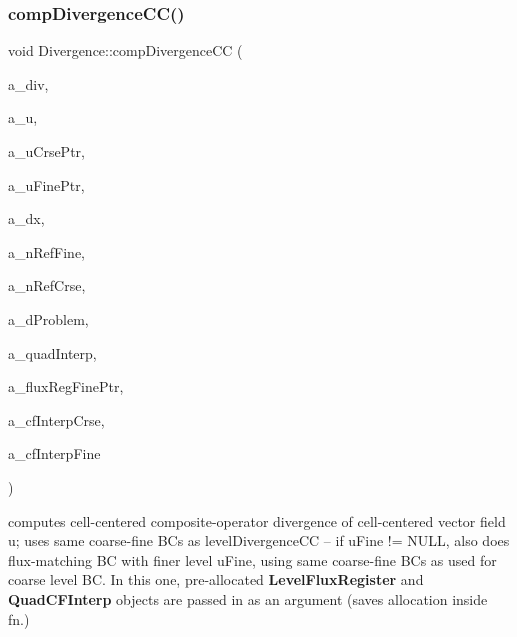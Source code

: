 \subsubsection{\texorpdfstring{comp\+Divergence\+C\+C()}{compDivergenceCC()}\hspace{0.1cm}{\footnotesize\ttfamily [3/4]}}
{\footnotesize\ttfamily void Divergence\+::comp\+Divergence\+CC (\begin{DoxyParamCaption}\item[{\textbf{ Level\+Data}$<$ \textbf{ F\+Array\+Box} $>$ \&}]{a\+\_\+div,  }\item[{\textbf{ Level\+Data}$<$ \textbf{ F\+Array\+Box} $>$ \&}]{a\+\_\+u,  }\item[{\textbf{ Level\+Data}$<$ \textbf{ F\+Array\+Box} $>$ $\ast$}]{a\+\_\+u\+Crse\+Ptr,  }\item[{\textbf{ Level\+Data}$<$ \textbf{ F\+Array\+Box} $>$ $\ast$}]{a\+\_\+u\+Fine\+Ptr,  }\item[{const \textbf{ Real}}]{a\+\_\+dx,  }\item[{const int}]{a\+\_\+n\+Ref\+Fine,  }\item[{const int}]{a\+\_\+n\+Ref\+Crse,  }\item[{const \textbf{ Problem\+Domain} \&}]{a\+\_\+d\+Problem,  }\item[{const bool}]{a\+\_\+quad\+Interp,  }\item[{\textbf{ Level\+Flux\+Register} $\ast$}]{a\+\_\+flux\+Reg\+Fine\+Ptr,  }\item[{\textbf{ Quad\+C\+F\+Interp} \&}]{a\+\_\+cf\+Interp\+Crse,  }\item[{\textbf{ Quad\+C\+F\+Interp} \&}]{a\+\_\+cf\+Interp\+Fine }\end{DoxyParamCaption})\hspace{0.3cm}{\ttfamily [static]}}

computes cell-\/centered composite-\/operator divergence of cell-\/centered vector field u; uses same coarse-\/fine BC\textquotesingle{}s as level\+Divergence\+CC -- if u\+Fine != N\+U\+LL, also does flux-\/matching BC with finer level u\+Fine, using same coarse-\/fine BC\textquotesingle{}s as used for coarse level BC. In this one, pre-\/allocated \textbf{ Level\+Flux\+Register} and \textbf{ Quad\+C\+F\+Interp} objects are passed in as an argument (saves allocation inside fn.) \mbox{\label{class_divergence_ab20b13344306e041cbf99e4234a46244}} 
